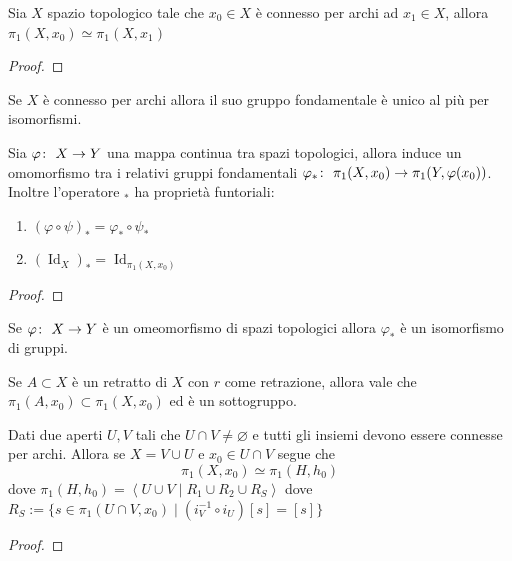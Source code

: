 \begin{theorem}
	Sia $X$ spazio topologico tale che $x_0 \in X$ è connesso per archi ad $x_1 \in X$, allora $\pi_1(X, x_0) \simeq \pi_1(X, x_1)$
\end{theorem}
\begin{proof}
	
\end{proof}

\begin{corollary}
	Se $X$ è connesso per archi allora il suo gruppo fondamentale è unico al più per isomorfismi.
\end{corollary}
	
	
\begin{theorem}
	Sia $\varphi \colon\ X \rightarrow Y$ una mappa continua tra spazi topologici, allora induce un omomorfismo tra i relativi gruppi fondamentali $\varphi_* \colon\ \pi_1(X, x_0) \rightarrow \pi_1(Y, \varphi(x_0))$. Inoltre l'operatore $_*$ ha proprietà funtoriali:
	\begin{enumerate}
		\item $(\varphi \circ \psi)_* = \varphi_* \circ \psi_*$
		\item $(\operatorname{Id}_{X})_* = \operatorname{Id}_{\pi_1(X, x_0)}$ 
	\end{enumerate}
\end{theorem}
\begin{proof}
\end{proof}

\begin{corollary}
	Se $\varphi \colon\ X \rightarrow Y$ è un omeomorfismo di spazi topologici allora $\varphi_*$ è un isomorfismo di gruppi. 
\end{corollary}

\begin{theorem}
	Se $A \subset X$ è un retratto di $X$ con $r$ come retrazione, allora vale che $\pi_1(A, x_0) \subset \pi_1(X, x_0)$ ed è un sottogruppo.  
\end{theorem}
	

\begin{theorem}
	Dati due aperti $U, V$ tali che $U \cap V \neq \varnothing$ e tutti gli insiemi devono essere connesse per archi. Allora se $X = V \cup U$ e $x_0 \in U\cap V$ segue che 
	\begin{equation*}
		\pi_1(X, x_0) \simeq \pi_1(H, h_0)
	\end{equation*} 
	dove $\pi_1(H,h_0) = \left\langle U \cup V \mid R_1 \cup R_2 \cup R_S \right\rangle$ dove $R_S := \{s \in \pi_1(U \cap V,x_0) \mid (i^{-1}_V \circ i_{U}) \left[s\right] = \left[s\right]\}$ 
\end{theorem}
\begin{proof}
\end{proof}

